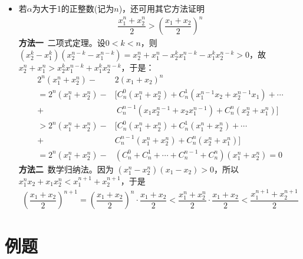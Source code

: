 \begin{itemize}[leftmargin=\inteval{\myitemleftmargin}pt,itemsep=
   \inteval{\myitemitempsep}pt,topsep=\inteval{\myitemtopsep}pt]
\item 若$ \alpha $为大于1的正整数(记为$ n $)，还可用其它方法证明
\begin{gather}\label{幂函数凹凸性不等式}
    \dfrac{x_1^n+x_2^n}{2}>\left( \dfrac{x_1+x_2}{2}\right)^n
\end{gather}
\textbf{方法一}\ 二项式定理。设$ 0<k<n $，则$ (x_2^k-x_1^k)(x_2^{n-k}-x_1^{n-k})=x_2^n+x_1^n-x_2^kx_1^{n-k}-x_1^kx_2^{n-k}>0 $，故
$ x_2^n+x_1^n > x_2^kx_1^{n-k}+x_1^kx_2^{n-k} $，于是：
\begin{align*}
    2^n(x_1^n+x_2^n)-& 2(x_1+x_2)^n \\
    =2^n(x_1^n+x_2^n)-&\bigl[C_n^0(x_1^n+x_2^n)+C_n^1(x_1^{n-1}x_2+x_2^{n-1}x_1)+\cdots\\
    + &\ C_n^{n-1}(x_1x_2^{n-1}+x_2x_1^{n-1})+C_n^n(x_2^n+x_1^n) \bigr] \\
    >2^n(x_1^n+x_2^n)-&\bigl[C_n^0(x_1^n+x_2^n)+C_n^1(x_1^n+x_2^n)
    +\cdots \\+ &C_n^{n-1}(x_1^n+x_2^n)+C_n^n(x_2^n+x_1^n) \bigr] \\
    =2^n(x_1^n+x_2^n)-&(C_n^0+C_n^1+\cdots +C_n^{n-1}+C_n^n)(x_1^n+x_2^n) = 0
\end{align*}
\textbf{方法二}\ 数学归纳法。因为 $ (x_1^n-x_2^n)(x_1-x_2)>0 $，所以
$ x_1^nx_2+x_1x_2^n<x_1^{n+1}+x_2^{n+1} $，于是
\begin{align*}
    \left(\dfrac{x_1+x_2}{2} \right)^{n+1} =
    \left(\dfrac{x_1+x_2}{2} \right)^{n}\cdot \dfrac{x_1+x_2}{2}
    <\dfrac{x_1^n+x_2^n}{2}\cdot
    \dfrac{x_1+x_2}{2} <\dfrac{x_1^{n+1}+x_2^{n+1}}{2} 
\end{align*}


\end{itemize}

\section{例题} 

